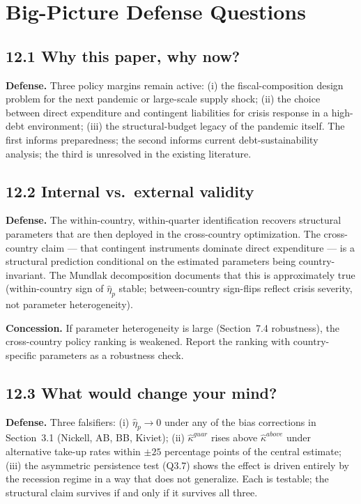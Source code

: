 \documentclass[11pt,a4paper]{article}
\begin{document}
\section{Big-Picture Defense Questions}

\subsection*{12.1 Why this paper, why now?}

\textbf{Defense.} Three policy margins remain active: (i) the fiscal-composition design problem for the next pandemic or large-scale supply shock; (ii) the choice between direct expenditure and contingent liabilities for crisis response in a high-debt environment; (iii) the structural-budget legacy of the pandemic itself. The first informs preparedness; the second informs current debt-sustainability analysis; the third is unresolved in the existing literature.

\subsection*{12.2 Internal vs.\ external validity}

\textbf{Defense.} The within-country, within-quarter identification recovers structural parameters that are then deployed in the cross-country optimization. The cross-country claim --- that contingent instruments dominate direct expenditure --- is a structural prediction conditional on the estimated parameters being country-invariant. The Mundlak decomposition documents that this is approximately true (within-country sign of $\hat\eta_p$ stable; between-country sign-flips reflect crisis severity, not parameter heterogeneity).

\textbf{Concession.} If parameter heterogeneity is large (Section~7.4 robustness), the cross-country policy ranking is weakened. Report the ranking with country-specific parameters as a robustness check.

\subsection*{12.3 What would change your mind?}

\textbf{Defense.} Three falsifiers: (i) $\hat\eta_p \to 0$ under any of the bias corrections in Section~3.1 (Nickell, AB, BB, Kiviet); (ii) $\hat\kappa^{guar}$ rises above $\hat\kappa^{above}$ under alternative take-up rates within $\pm 25$ percentage points of the central estimate; (iii) the asymmetric persistence test (Q3.7) shows the effect is driven entirely by the recession regime in a way that does not generalize. Each is testable; the structural claim survives if and only if it survives all three.
\end{document}
